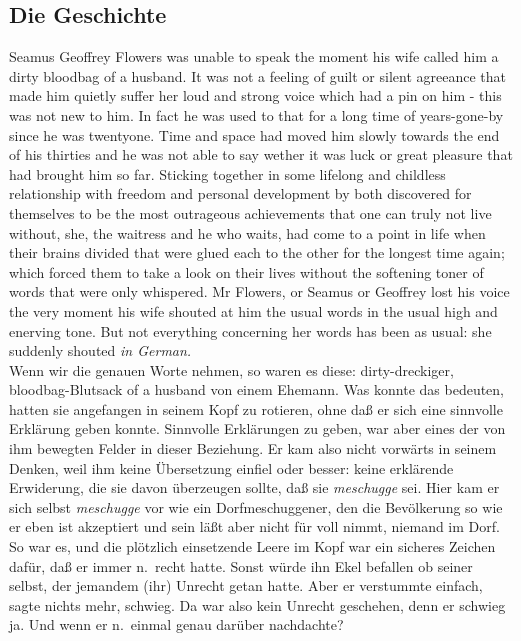 \documentclass[
]{article}
\author{}
\date{\vspace{-2.5em}}
\begin{document}
\subsection{Die Geschichte}\label{die-geschichte}

Seamus Geoffrey Flowers was unable to speak the moment his wife called
him a dirty bloodbag of a husband. It was not a feeling of guilt or
silent agreeance that made him quietly suffer her loud and strong voice
which had a pin on him - this was not new to him. In fact he was used to
that for a long time of years-gone-by since he was twentyone. Time and
space had moved him slowly towards the end of his thirties and he was
not able to say wether it was luck or great pleasure that had brought
him so far. Sticking together in some lifelong and childless
relationship with freedom and personal development by both discovered
for themselves to be the most outrageous achievements that one can truly
not live without, she, the waitress and he who waits, had come to a
point in life when their brains divided that were glued each to the
other for the longest time again; which forced them to take a look on
their lives without the softening toner of words that were only
whispered. Mr Flowers, or Seamus or Geoffrey lost his voice the very
moment his wife shouted at him the usual words in the usual high and
enerving tone. But not everything concerning her words has been as
usual: she suddenly shouted \emph{in German.}\\
Wenn wir die genauen Worte nehmen, so waren es diese: dirty-dreckiger,
bloodbag-Blutsack of a husband von einem Ehemann. Was konnte das
bedeuten, hatten sie angefangen in seinem Kopf zu rotieren, ohne daß er
sich eine sinnvolle Erklärung geben konnte. Sinnvolle Erklärungen zu
geben, war aber eines der von ihm bewegten Felder in dieser Beziehung.
Er kam also nicht vorwärts in seinem Denken, weil ihm keine Übersetzung
einfiel oder besser: keine erklärende Erwiderung, die sie davon
überzeugen sollte, daß sie \emph{meschugge} sei. Hier kam er sich selbst
\emph{meschugge} vor wie ein Dorfmeschuggener, den die Bevölkerung so
wie er eben ist akzeptiert und sein läßt aber nicht für voll nimmt,
niemand im Dorf. So war es, und die plötzlich einsetzende Leere im Kopf
war ein sicheres Zeichen dafür, daß er immer n.~recht hatte. Sonst würde
ihn Ekel befallen ob seiner selbst, der jemandem (ihr) Unrecht getan
hatte. Aber er verstummte einfach, sagte nichts mehr, schwieg. Da war
also kein Unrecht geschehen, denn er schwieg ja. Und wenn er n.~einmal
genau darüber nachdachte?\\
\end{document}
